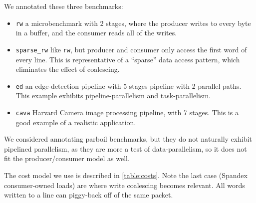 We annotated these three benchmarks:

\begin{itemize}
    \item \verb+rw+ a microbenchmark with 2 stages, where the producer writes to every byte in a buffer, and the consumer reads all of the writes.
    \item \verb+sparse_rw+ like \verb+rw+, but producer and consumer only access the first word of every line. This is representative of a ``sparse'' data access pattern, which eliminates the effect of coalescing.
    \item \verb+ed+ an edge-detection pipeline with 5 stages pipeline with 2 parallel paths. This example exhibits pipeline-parallelism and task-parallelism.
    \item \verb+cava+ Harvard Camera image processing pipeline, with 7 stages. This is a good example of a realistic application.
\end{itemize}

We considered annotating parboil benchmarks, but they do not naturally exhibit pipelined parallelism, as they are more a test of data-parallelism, so it does not fit the producer/consumer model as well.

The cost model we use is described in \cref{table:costs}. Note the last case (Spandex consumer-owned loads) are where write coalescing becomes relevant. All words written to a line can piggy-back off of the same packet.

